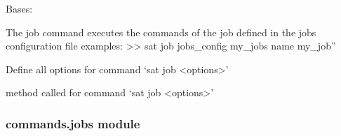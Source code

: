 \documentclass[a4paper,10pt,english]{sphinxmanual}
\begin{document}
\begin{fulllineitems}
\label{\detokenize{apidoc_commands/commands:commands.job.Command}}
Bases: 

The job command executes the commands of the job defined
in the jobs configuration file  
\textbar{} examples:
\textbar{} \textgreater{}\textgreater{} sat job \textendash{}jobs\_config my\_jobs \textendash{}name my\_job”

\begin{fulllineitems}
\label{\detokenize{apidoc_commands/commands:commands.job.Command.getParser}}
Define all options for command ‘sat job \textless{}options\textgreater{}’

\end{fulllineitems}


\begin{fulllineitems}
\label{\detokenize{apidoc_commands/commands:commands.job.Command.name}}
\end{fulllineitems}


\begin{fulllineitems}
\label{\detokenize{apidoc_commands/commands:commands.job.Command.run}}
method called for command ‘sat job \textless{}options\textgreater{}’

\end{fulllineitems}


\end{fulllineitems}



\subsubsection{commands.jobs module}
\label{\detokenize{apidoc_commands/commands:commands-jobs-module}}\label{\detokenize{apidoc_commands/commands:module-commands.jobs}}
\end{document}
